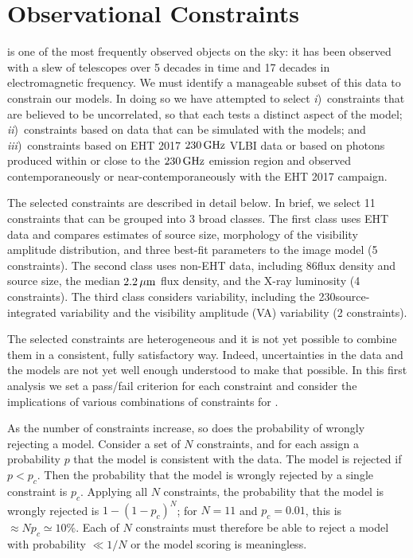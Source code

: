 \section{Observational Constraints}\label{sec:observations}



\sgra is one of the most frequently observed objects on the sky: it has been observed with a slew of telescopes over 5 decades in time and 17 decades in electromagnetic frequency. We must identify a manageable subset of this data to constrain our models. In doing so we have attempted to select
\emph{i})~constraints that are believed to be uncorrelated, so that each tests a distinct aspect of the model; \emph{ii})~constraints based on data that can be simulated with the models; and
\emph{iii})~constraints based on EHT 2017 $230\,\mathrm{GHz}$ VLBI data or based on photons produced within or close to the $230\,\mathrm{GHz}$ emission region and observed contemporaneously or near-contemporaneously with the EHT 2017 campaign.

The selected constraints are described in detail below.  In brief, we select 11 constraints that can be grouped into 3 broad classes.  The first class uses EHT data and compares estimates of source size, morphology of the visibility amplitude distribution, and three best-fit parameters to the \mring image model (5 constraints).  The second class uses non-EHT data, including 86\GHz flux density and source size, the median $2.2\,\mu\mathrm{m}$ flux density, and the X-ray luminosity (4 constraints).  The third class considers variability, including the 230\GHz source-integrated variability and the visibility amplitude (VA) variability (2 constraints).

The selected constraints are heterogeneous and it is not yet possible to combine them in a consistent, fully satisfactory way.  Indeed, uncertainties in the data and the models are not yet well enough understood to make that possible.  In this first analysis we set a pass/fail criterion for each constraint and consider the implications of various combinations of constraints for \sgra.

As the number of constraints increase, so does the probability of wrongly rejecting a model.  Consider a set of $N$ constraints, and for each assign a probability $p$ that the model is consistent with the data.  The model is rejected if $p < p_c$.  Then the probability that the model is wrongly rejected by a single constraint is $p_c$.  Applying all $N$ constraints, the probability that the model is wrongly rejected is $1 - (1 - p_c)^N$; for $N = 11$ and $p_c = 0.01$, this is $\approx N p_c \simeq 10\%$.  Each of $N$ constraints  must therefore be able to reject a model with probability $\ll 1/N$ or the model scoring is meaningless.

